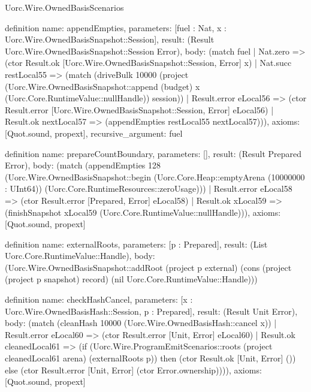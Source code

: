 \begin{lexlean}{Uorc.Wire.OwnedBasisScenarios}
\begin{semanticmodule}
definition{
  name: appendEmpties,
  parameters: [fuel : Nat, x : Uorc.Wire.OwnedBasisSnapshot::Session],
  result: (Result Uorc.Wire.OwnedBasisSnapshot::Session Error),
  body: (match fuel
    | Nat.zero => (ctor Result.ok [Uorc.Wire.OwnedBasisSnapshot::Session, Error] x)
    | Nat.succ restLocal55 => (match (driveBulk 10000 (project (Uorc.Wire.OwnedBasisSnapshot::append (budget) x (Uorc.Core.RuntimeValue::nullHandle)) session))
      | Result.error eLocal56 => (ctor Result.error [Uorc.Wire.OwnedBasisSnapshot::Session, Error] eLocal56)
      | Result.ok nextLocal57 => (appendEmpties restLocal55 nextLocal57))),
  axioms: [Quot.sound, propext],
  recursive_argument: fuel
}

definition{
  name: prepareCountBoundary,
  parameters: [],
  result: (Result Prepared Error),
  body: (match (appendEmpties 128 (Uorc.Wire.OwnedBasisSnapshot::begin (Uorc.Core.Heap::emptyArena (10000000 : UInt64)) (Uorc.Core.RuntimeResources::zeroUsage)))
    | Result.error eLocal58 => (ctor Result.error [Prepared, Error] eLocal58)
    | Result.ok xLocal59 => (finishSnapshot xLocal59 (Uorc.Core.RuntimeValue::nullHandle))),
  axioms: [Quot.sound, propext]
}

definition{
  name: externalRoots,
  parameters: [p : Prepared],
  result: (List Uorc.Core.RuntimeValue::Handle),
  body: (Uorc.Wire.OwnedBasisSnapshot::addRoot (project p external) (cons (project (project p snapshot) record) (nil Uorc.Core.RuntimeValue::Handle)))
}

definition{
  name: checkHashCancel,
  parameters: [x : Uorc.Wire.OwnedBasisHash::Session, p : Prepared],
  result: (Result Unit Error),
  body: (match (cleanHash 10000 (Uorc.Wire.OwnedBasisHash::cancel x))
    | Result.error eLocal60 => (ctor Result.error [Unit, Error] eLocal60)
    | Result.ok cleanedLocal61 => (if (Uorc.Wire.ProgramEmitScenarios::roots (project cleanedLocal61 arena) (externalRoots p)) then (ctor Result.ok [Unit, Error] ()) else (ctor Result.error [Unit, Error] (ctor Error.ownership)))),
  axioms: [Quot.sound, propext]
}


\end{semanticmodule}
\end{lexlean}

